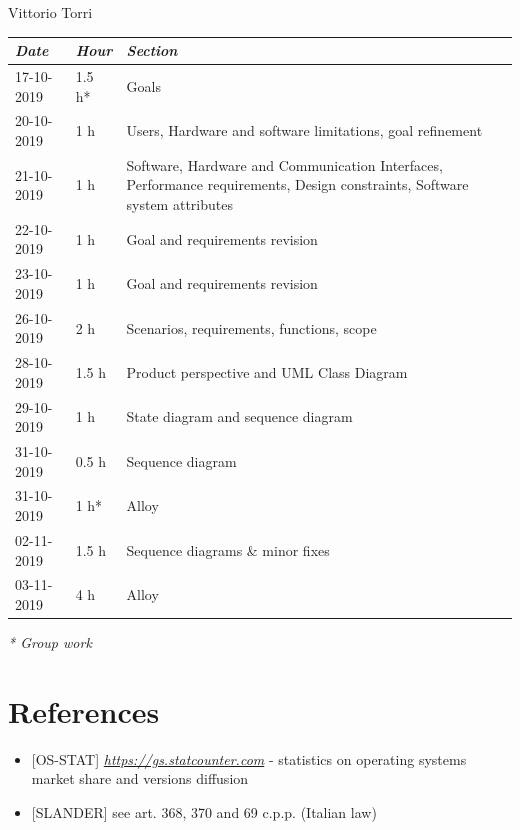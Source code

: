 \documentclass[a4paper]{report}
\begin{document}
\begin{center}
Vittorio Torri \\
\begin{tabular}{p{2cm}p{1.5cm}p{7cm}}
\toprule
\textit{Date} & \textit{Hour} & \textit{Section} \\ \midrule
17-10-2019 & 1.5 h* & Goals \\ \midrule
20-10-2019 & 1 h & Users, Hardware and software limitations, goal refinement \\ \midrule
21-10-2019 & 1 h & Software, Hardware and Communication Interfaces, Performance requirements, Design constraints, Software system attributes \\ \midrule
22-10-2019 & 1 h & Goal and requirements revision \\ \midrule
23-10-2019 & 1 h & Goal and requirements revision \\ \midrule
26-10-2019 & 2 h & Scenarios, requirements, functions, scope \\  \midrule
28-10-2019 & 1.5 h & Product perspective and UML Class Diagram \\ \midrule
29-10-2019 & 1 h & State diagram and sequence diagram \\ \midrule
31-10-2019 & 0.5 h & Sequence diagram \\ \midrule
31-10-2019 & 1 h* & Alloy \\ \midrule
02-11-2019 & 1.5 h & Sequence diagrams \& minor fixes \\ \midrule
03-11-2019 & 4 h & Alloy \\
\bottomrule
\end{tabular}
\end{center}
\textit{* Group work}

\chapter{References}
\begin{itemize}

\item \label{ref:os-stats} [OS-STAT] \href{https://gs.statcounter.com}{\textit{https://gs.statcounter.com}} - statistics on operating systems market share and versions diffusion

\item \label{ref:slander} [SLANDER] see art. 368, 370 and 69 c.p.p. (Italian law)

\end{itemize}
\end{document}
